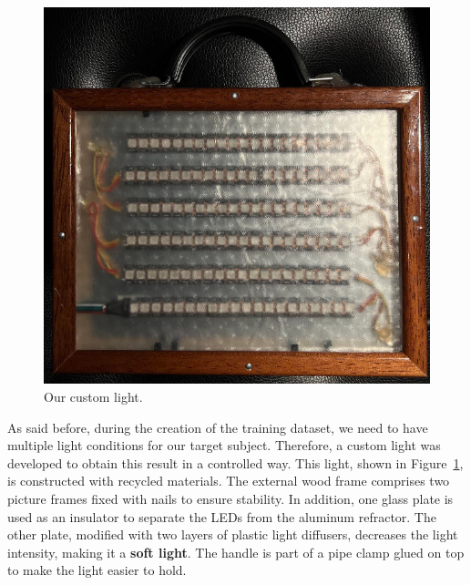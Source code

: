 \documentclass[preprint]{elsarticle}
\begin{document}
\begin{figure}[t]
	\centering
	\includegraphics[scale=0.25, keepaspectratio]{img/project_img/light.jpeg}
	\caption{Our custom light.}
	\label{fig:light}
\end{figure}

As said before, during the creation of the training dataset, we need to have multiple 
light conditions for our target subject. 
Therefore, a custom light was developed to obtain this result in a controlled way. This light, shown in Figure~\ref{fig:light}, is constructed with recycled materials. The external wood frame comprises two picture frames fixed with nails to ensure stability.  In addition, one glass plate is used as an insulator to separate the LEDs from the aluminum refractor. The other plate, modified with two layers of plastic light diffusers,  decreases the light intensity, making it a \textbf{soft light}.
The handle is part of a pipe clamp glued on top to make the light easier to hold.
\end{document}
